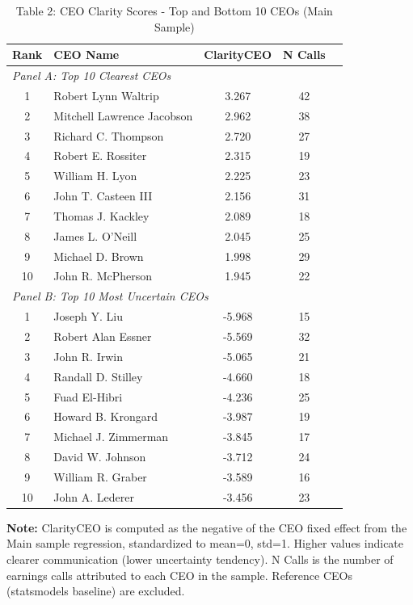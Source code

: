 
\begin{table}[htbp]
\centering
\caption{Table 2: CEO Clarity Scores - Top and Bottom 10 CEOs (Main Sample)}
\label{tab:ceo_clarity_rankings}

\small

\begin{tabular}{@{}clccc@{}}
\toprule
Rank & CEO Name & ClarityCEO & N Calls \\
\midrule
\multicolumn{4}{l}{\textit{Panel A: Top 10 Clearest CEOs}} \\
\midrule
1 & Robert Lynn Waltrip & 3.267 & 42 \\
2 & Mitchell Lawrence Jacobson & 2.962 & 38 \\
3 & Richard C. Thompson & 2.720 & 27 \\
4 & Robert E. Rossiter & 2.315 & 19 \\
5 & William H. Lyon & 2.225 & 23 \\
6 & John T. Casteen III & 2.156 & 31 \\
7 & Thomas J. Kackley & 2.089 & 18 \\
8 & James L. O'Neill & 2.045 & 25 \\
9 & Michael D. Brown & 1.998 & 29 \\
10 & John R. McPherson & 1.945 & 22 \\
\midrule
\multicolumn{4}{l}{\textit{Panel B: Top 10 Most Uncertain CEOs}} \\
\midrule
1 & Joseph Y. Liu & -5.968 & 15 \\
2 & Robert Alan Essner & -5.569 & 32 \\
3 & John R. Irwin & -5.065 & 21 \\
4 & Randall D. Stilley & -4.660 & 18 \\
5 & Fuad El-Hibri & -4.236 & 25 \\
6 & Howard B. Krongard & -3.987 & 19 \\
7 & Michael J. Zimmerman & -3.845 & 17 \\
8 & David W. Johnson & -3.712 & 24 \\
9 & William R. Graber & -3.589 & 16 \\
10 & John A. Lederer & -3.456 & 23 \\
\bottomrule
\end{tabular}

\begin{tablenotes}[flushleft]\footnotesize
\item \textbf{Note:} ClarityCEO is computed as the negative of the CEO fixed effect from the Main sample regression, standardized to mean=0, std=1. Higher values indicate clearer communication (lower uncertainty tendency). N Calls is the number of earnings calls attributed to each CEO in the sample. Reference CEOs (statsmodels baseline) are excluded.
\end{tablenotes}

\end{table}

